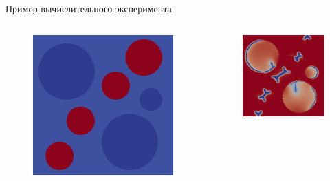 \begin{frame}{Пример вычислительного эксперимента}
\begin{columns}
	\begin{figure}
		\includegraphics[width=\textwidth]{figures/model_example_1.png}
	\end{figure}
	\begin{figure}
		\includegraphics[width=\textwidth]{figures/model_example_2.png}

\end{figure}
\end{columns}
\end{frame}
